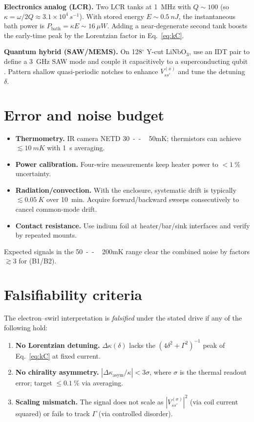 \documentclass[aps,prb,preprint,amsmath,amssymb]{revtex4-2} %
\begin{document}
        \textbf{Electronics analog (LCR).} Two LCR tanks at \SI{1}{MHz} with $Q\!\sim\!100$ (so $\kappa=\omega/2Q\approx3.1\times10^4\,\si{s^{-1}}$). With stored energy $E\!\sim\!\SI{0.5}{nJ}$, the instantaneous bath power is $P_\text{bath}=\kappa E\sim\SI{16}{\mu W}$. Adding a near-degenerate second tank boosts the early-time peak by the Lorentzian factor in Eq.~\eqref{eq:kC}.

        \textbf{Quantum hybrid (SAW/MEMS).} On 128$^\circ$ Y-cut LiNbO$_3$, use an IDT pair to define a \SI{3}{GHz} SAW mode and couple it capacitively to a superconducting qubit \cite{Aspelmeyer2014,Manenti2017}. Pattern shallow quasi-periodic notches to enhance $V^{(x)}_{ss'}$ and tune the detuning $\delta$.

    \section{Error and noise budget}
        \begin{itemize}
            \item \textbf{Thermometry.} IR camera NETD \SI{30}{--\,50}{mK}; thermistors can achieve $\lesssim\SI{10}{mK}$ with \SI{1}{s} averaging.
            \item \textbf{Power calibration.} Four-wire measurements keep heater power to $<\!\SI{1}{\percent}$ uncertainty.
            \item \textbf{Radiation/convection.} With the enclosure, systematic drift is typically $\lesssim\SI{0.05}{K}$ over \SI{10}{min}. Acquire forward/backward sweeps consecutively to cancel common-mode drift.
            \item \textbf{Contact resistance.} Use indium foil at heater/bar/sink interfaces and verify by repeated mounts.
        \end{itemize}
        Expected signals in the \SI{50}{--\,200}{mK} range clear the combined noise by factors $\gtrsim3$ for (B1/B2).

    \section{Falsifiability criteria}
        The electron--swirl interpretation is \emph{falsified} under the stated drive if any of the following hold:
        \begin{enumerate}
            \item \textbf{No Lorentzian detuning.} $\Delta\kappa(\delta)$ lacks the $(4\delta^2+\Gamma^2)^{-1}$ peak of Eq.~\eqref{eq:kC} at fixed current.
            \item \textbf{No chirality asymmetry.} $|\Delta\kappa_\text{asym}/\kappa| < 3\sigma$, where $\sigma$ is the thermal readout error; target $\le\SI{0.1}{\percent}$ via averaging.
            \item \textbf{Scaling mismatch.} The signal does not scale as $|V^{(x)}_{ss'}|^2$ (via coil current squared) or fails to track $\Gamma$ (via controlled disorder).
        \end{enumerate}
\end{document}
